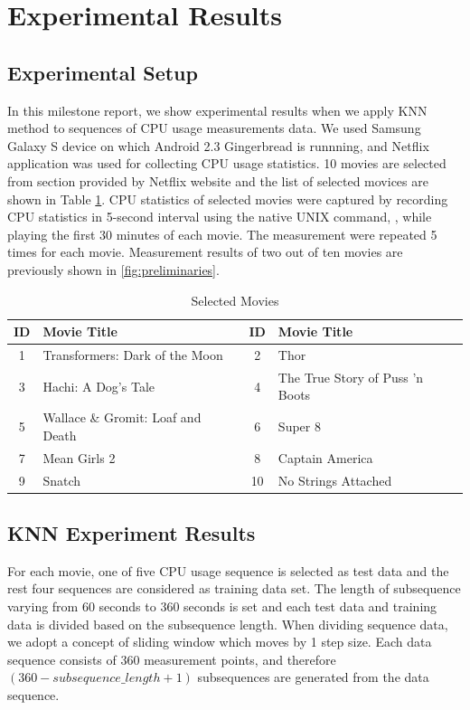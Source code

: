 \section{Experimental Results}
\label{sec:experiments}

\subsection{Experimental Setup}


In this milestone report, we show experimental results when we apply KNN method to sequences of CPU usage measurements data.
We used Samsung Galaxy S device on which Android 2.3 Gingerbread is runnning, and Netflix application was used for collecting CPU usage statistics.
10 movies are selected from  section provided by Netflix website and the list of selected movices are shown in Table \ref{tab:movies}.
CPU statistics of selected movies were captured by recording CPU statistics in 5-second interval using the native UNIX command, , while playing the first 30 minutes of each movie. 
The measurement were repeated 5 times for each movie.
Measurement results of two out of ten movies are previously shown in \ref{fig:preliminaries}.

\begin{table}[h!]
\begin{center}
\begin{tabular}{|c|l|c|l|}
\hline
ID & Movie Title & ID & Movie Title \\ 
\hline
1 & Transformers: Dark of the Moon 		& 2 & Thor \\
3 & Hachi: A Dog's Tale 			& 4 & The True Story of Puss 'n Boots \\
5 & Wallace \& Gromit: Loaf and Death 	& 6 & Super 8 \\
7 & Mean Girls 2 				& 8 & Captain America \\
9 & Snatch 					& 10 & No Strings Attached \\
\hline
\end{tabular}
\end{center}
\caption{Selected Movies}
\label{tab:movies}
\end{table}


\subsection{KNN Experiment Results}

For each movie, one of five CPU usage sequence is selected as test data and the rest four sequences are considered as training data set. 
The length of subsequence varying from 60 seconds to 360 seconds is set and each test data and training data is divided based on the subsequence length.
When dividing sequence data, we adopt a concept of sliding window which moves by 1 step size.
Each data sequence consists of $360$ measurement points, and therefore $(360 - subsequence\_length + 1)$ subsequences are generated from the data sequence. 

